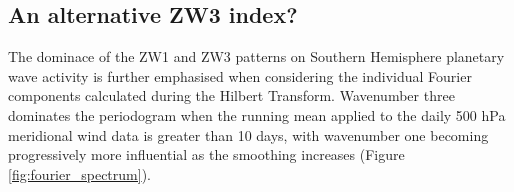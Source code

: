 \subsection{An alternative ZW3 index?}

The dominace of the ZW1 and ZW3 patterns on Southern Hemisphere planetary wave activity is further emphasised when considering the individual Fourier components calculated during the Hilbert Transform. Wavenumber three dominates the periodogram when the running mean applied to the daily 500 hPa meridional wind data is greater than 10 days, with wavenumber one becoming progressively more influential as the smoothing increases (Figure \ref{fig:fourier_spectrum}).

